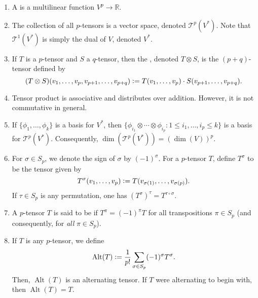 \documentclass[12pt]{article}
\newcommand{\T}{\mathscr{T}}
\DeclareMathOperator{\Alt}{Alt}
\begin{document}
\begin{enumerate}[leftmargin=*]
	\item A  is a multilinear function $V^{p} \to \mathbb{R}$.
	\item The collection of all $p$-tensors is a vector space, denoted $\T^{p}(V^{\ast})$. \newline
	Note that $\T^{1}(V^{\ast})$ is simply the dual of $V$, denoted $V^{\ast}$.
	\item If $T$ is a $p$-tensor and $S$ a $q$-tensor, then the , denoted $T \otimes S$, is the $(p + q)$-tensor defined by
	\begin{equation*} 
		(T \otimes S)(v_{1}, \ldots, v_{p}, v_{p + 1}, \ldots, v_{p + q}) \vcentcolon= T(v_{1}, \ldots, v_{p}) \cdot S(v_{p + 1}, \ldots, v_{p + q}).
	\end{equation*}
	\item Tensor product is associative and distributes over addition. However, it is not commutative in general.
	\item If $\{\phi_{1}, \ldots, \phi_{k}\}$ is a basis for $V^{\ast}$, then $\{\phi_{i_{1}} \otimes \cdots \otimes \phi_{i_{p}} : 1 \le i_{1}, \ldots, i_{p} \le k\}$ is a basis for $\T^{p}(V^{\ast})$. Consequently, $\dim(\T^{p}(V^{\ast})) = (\dim(V))^{p}$.
	\item For $\sigma \in S_{p}$, we denote the sign of $\sigma$ by $(-1)^{\sigma}$. \newline
	For a $p$-tensor $T$, define $T^{\sigma}$ to be the tensor given by
	\begin{equation*} 
		T^{\sigma}(v_{1}, \ldots, v_{p}) \vcentcolon= T(v_{\sigma(1)}, \ldots, v_{\sigma(p)}).
	\end{equation*}
	If $\tau \in S_{p}$ is any permutation, one has $(T^{\sigma})^{\tau} = T^{\tau \circ \sigma}$.
	\item A $p$-tensor $T$ is said to be  if $T^{\pi} = (-1)^{\pi} T$ for all transpositions $\pi \in S_{p}$ (and consequently, for \emph{all} $\pi \in S_{p}$).
	\item If $T$ is any $p$-tensor, we define
	\begin{equation*} 
		\Alt(T) \vcentcolon= \frac{1}{p!} \sum_{\sigma \in S_{p}} (-1)^{\sigma} T^{\sigma}.
	\end{equation*}
	Then, $\Alt(T)$ is an alternating tensor. If $T$ were alternating to begin with, then $\Alt(T) = T$.

\end{enumerate}
\end{document}
